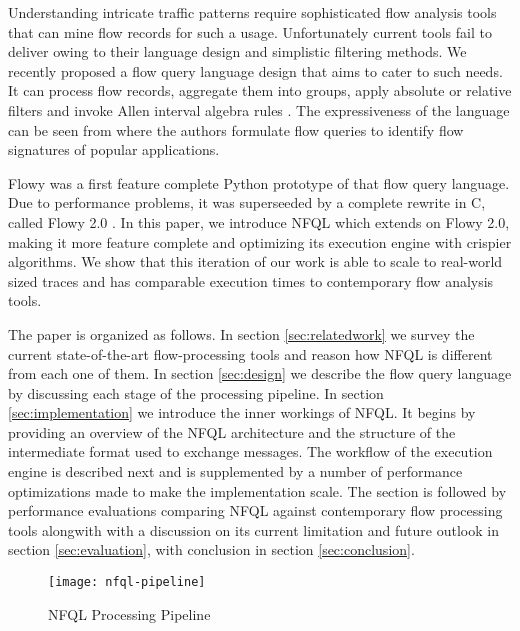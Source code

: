 Understanding intricate traffic patterns require sophisticated flow analysis
tools that can mine flow records for such a usage.  Unfortunately current
tools fail to deliver owing to their language design and simplistic filtering
methods.  We recently proposed a flow query language design
\cite{vmarinov:2009} that aims to cater to such needs.  It can process
flow records, aggregate them into groups, apply absolute or relative filters
and invoke Allen interval algebra rules \cite{fallen:1983}. The expressiveness
of the language can be seen from \cite{vperelman:2011} where the authors
formulate flow queries to identify flow signatures of popular applications.

Flowy \cite{kkanev:2010} was a first feature complete Python prototype of that
flow query language. Due to performance problems, it was superseeded by a
complete rewrite in C, called Flowy 2.0 \cite{jschauer:thesis:2011}. In this
paper, we introduce \ac{NFQL} which extends on Flowy 2.0, making it more
feature complete and optimizing its execution engine with crispier algorithms.
We show that this iteration of our work is able to scale to real-world sized
traces and has comparable execution times to contemporary flow analysis tools.

The paper is organized as follows. In section \ref{sec:relatedwork} we survey
the current state-of-the-art flow-processing tools and reason how \ac{NFQL} is
different from each one of them. In section \ref{sec:design} we describe the
flow query language by discussing each stage of the processing pipeline. In
section \ref{sec:implementation} we introduce the inner workings of \ac{NFQL}.
It begins by providing an overview of the \ac{NFQL} architecture and the
structure of the intermediate format used to exchange messages. The workflow of
the execution engine is described next and is supplemented by a number of
performance optimizations made to make the implementation scale. The section is
followed by performance evaluations comparing \ac{NFQL} against contemporary
flow processing tools alongwith with a discussion on its current limitation and
future outlook in section \ref{sec:evaluation}, with conclusion in section
\ref{sec:conclusion}.

\begin{figure*}[!t]
\centering
\texttt{[image: nfql-pipeline]}
\caption{NFQL Processing Pipeline \cite{vmarinov:2009}}
\label{fig:nfql-pipeline}
\end{figure*}

